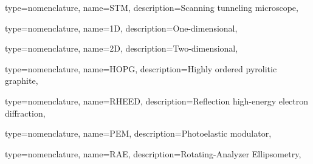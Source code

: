 {type={nomenclature},
name={STM},
description={Scanning tunneling microscope},
}


{type={nomenclature},
name={1D},
description={One-dimensional},
}


{type={nomenclature},
name={2D},
description={Two-dimensional},
}


{type={nomenclature},
name={HOPG},
description={Highly ordered pyrolitic graphite},
}


{type={nomenclature},
name={RHEED},
description={Reflection high-energy electron diffraction},
}


{type={nomenclature},
name={PEM},
description={Photoelastic modulator},
}

{type={nomenclature},
name={RAE},
description={Rotating-Analyzer Ellipsometry},
}


\renewcommand{\glsnamefont}[1]{\textcolor{black}{\textbf{#1}}}
\printunsrtglossary[type=nomenclature,style=long3col]
\printunsrtglossary[type=abbreviations,title={Packages and codes used}]
\printunsrtglossary[type=symbols,]

